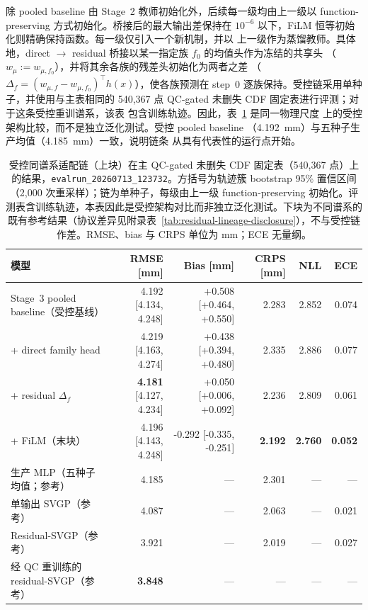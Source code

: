 除 pooled baseline 由 Stage~2 教师初始化外，后续每一级均由上一级以
function-preserving 方式初始化。桥接后的最大输出差保持在 \(10^{-6}\)
以下，FiLM 恒等初始化则精确保持函数。每一级仅引入一个新机制，并以
上一级作为蒸馏教师。具体地，direct \(\to\) residual 桥接以某一指定族 \(f_0\) 的均值头作为冻结的共享头
（\(w_{\mu} := w_{\mu,f_0}\)），并将其余各族的残差头初始化为两者之差
（\(\Delta_f = (w_{\mu,f} - w_{\mu,f_0})^{\top} h(x)\)），使各族预测在 step~0 逐族保持。受控链采用单种子，并使用与主表相同的 540{,}367
点 QC-gated 未删失 CDF 固定表进行评测；对于这条受控重训谱系，该表
包含训练轨迹。因此，表~\ref{tab:posthoc-residual-rewrite} 是同一物理尺度
上的受控架构比较，而不是独立泛化测试。受控 pooled baseline
（\SI{4.192}{mm}）与五种子生产均值（\SI{4.185}{mm}）一致，说明链条
从具有代表性的运行点开始。

\begin{table}[t]
\centering
\scriptsize
\setlength{\tabcolsep}{3pt}
\begin{tabular}{@{}lrrrrr@{}}
\toprule
模型 & RMSE [mm] & Bias [mm] & CRPS [mm] & NLL & ECE \\
\midrule
Stage~3 pooled baseline（受控基线） & 4.192 [4.134, 4.248] & +0.508 [+0.464, +0.550] & 2.283 & 2.852 & 0.074 \\
\quad + direct family head & 4.219 [4.163, 4.274] & +0.438 [+0.394, +0.480] & 2.335 & 2.886 & 0.077 \\
\quad + residual \(\Delta_f\) & \textbf{4.181} [4.127, 4.234] & +0.050 [+0.006, +0.092] & 2.236 & 2.809 & 0.061 \\
\quad + FiLM（末块） & 4.196 [4.143, 4.248] & -0.292 [-0.335, -0.251] & \textbf{2.192} & \textbf{2.760} & \textbf{0.052} \\
\midrule
生产 MLP（五种子均值；参考） & 4.185 & --- & 2.301 & --- & --- \\
单输出 SVGP（参考） & 4.087 & --- & 2.063 & --- & 0.021 \\
Residual-SVGP（参考） & 3.921 & --- & 2.019 & --- & 0.027 \\
经 QC 重训练的 residual-SVGP（参考） & \textbf{3.848} & --- & --- & --- & --- \\
\bottomrule
\end{tabular}
\caption{受控同谱系适配链（上块）在主 QC-gated 未删失 CDF 固定表（540{,}367 点）上的结果，\texttt{evalrun\_\allowbreak{}20260713\_\allowbreak{}123732}。方括号为轨迹簇 bootstrap 95\% 置信区间（2{,}000 次重采样）；链为单种子，每级由上一级 function-preserving 初始化。评测表含训练轨迹，本表因此是受控架构对比而非独立泛化测试。下块为不同谱系的既有参考结果（协议差异见附录表~\ref{tab:residual-lineage-disclosure}），不与受控链作差。RMSE、bias 与 CRPS 单位为 mm；ECE 无量纲。}
\label{tab:posthoc-residual-rewrite}
\end{table}

